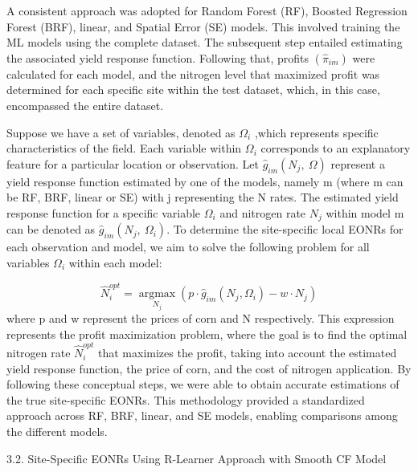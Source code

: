 \documentclass[
  12pt,
]{article}
\begin{document}
A consistent approach was adopted for Random Forest (RF), Boosted Regression Forest (BRF), linear, and Spatial Error (SE) models. This involved training the ML models using the complete dataset. The subsequent step entailed estimating the associated yield response function. Following that, profits \(({\hat{\pi}}_{im})\) were calculated for each model, and the nitrogen level that maximized profit was determined for each specific site within the test dataset, which, in this case, encompassed the entire dataset.

Suppose we have a set of variables, denoted as \(\Omega_i\) ,which represents specific characteristics of the field. Each variable within \(\Omega_i\) corresponds to an explanatory feature for a particular location or observation. Let \({\hat{g}}_{im}(N_j,\ \Omega)\) represent a yield response function estimated by one of the models, namely m (where m can be RF, BRF, linear or SE) with j representing the N rates. The estimated yield response function for a specific variable \(\Omega_i\) and nitrogen rate \(N_j\) within model m can be denoted as \({\hat{g}}_{im}(N_j,\ \Omega_i)\). To determine the site-specific local EONRs for each observation and model, we aim to solve the following problem for all variables \(\Omega_i\) within each model:

\[
\widehat{N}_i^{o p t}=\underset{N_j}{\operatorname{argmax}}\left(p \cdot \hat{g}_{i m}\left(N_j, \Omega_i\right)-w \cdot N_j\right)
\]
where p and w represent the prices of corn and N respectively. This expression represents the profit maximization problem, where the goal is to find the optimal nitrogen rate \({\hat{N}}_i^{opt}\) that maximizes the profit, taking into account the estimated yield response function, the price of corn, and the cost of nitrogen application.
By following these conceptual steps, we were able to obtain accurate estimations of the true site-specific EONRs. This methodology provided a standardized approach across RF, BRF, linear, and SE models, enabling comparisons among the different models.

3.2. Site-Specific EONRs Using R-Learner Approach with Smooth CF Model
\end{document}
